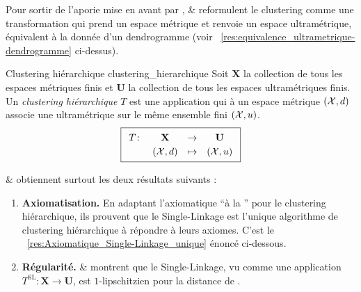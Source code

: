 Pour sortir de l'aporie mise en avant par ,  \&  \cite{CarlssonMemoli2010} reformulent le clustering comme une transformation qui prend un espace métrique et renvoie un espace {ultramétrique}, équivalent à la donnée d'un dendrogramme (voir \Res~\ref{res:equivalence_ultrametrique-dendrogramme} ci-dessus).

\begin{Definition}{Clustering hiérarchique \cite{CarlssonMemoli2010}}{clustering_hierarchique}
    Soit $\mathbf X$ la collection de tous les espaces métriques finis et $\mathbf U$ la collection de tous les espaces ultramétriques finis. Un \emph{clustering hiérarchique} $T$ est une application qui à un espace métrique $(\mathcal{X},d)$ associe une ultramétrique sur le même ensemble fini $(\mathcal{X},u)$.
\[
\boxed{
    \renewcommand{\arraystretch}{1.2} %
    \begin{array}{c c c c}
        T \colon & \mathbf{X} & \to & \mathbf{U} \\
                 & (\X,d) & \mapsto & (\X,u)
    \end{array}
}
\]
\end{Definition}



 \&  \cite{CarlssonMemoli2010} obtiennent surtout les deux résultats suivants :
\begin{enumerate}%
    \item \textbf{Axiomatisation.} En adaptant l'axiomatique ``à la '' pour le clustering hiérarchique, ils prouvent que le Single-Linkage est l'unique algorithme de clustering hiérarchique à répondre à leurs axiomes. C'est le \Res~\ref{res:Axiomatique_Single-Linkage_unique} énoncé ci-dessous.
    \item \textbf{Régularité.}  \&  montrent que le Single-Linkage, vu comme une application $T^{\mathrm{SL}} : \mathbf X \to \mathbf U$, est $1$-lipschitzien pour la distance de .
\end{enumerate}


